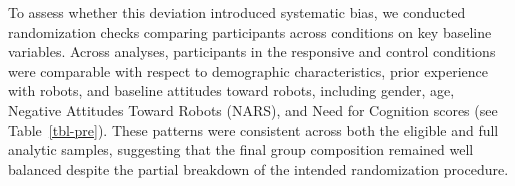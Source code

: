 \documentclass[
]{article}
\begin{document}
To assess whether this deviation introduced systematic bias, we
conducted randomization checks comparing participants across conditions
on key baseline variables. Across analyses, participants in the
responsive and control conditions were comparable with respect to
demographic characteristics, prior experience with robots, and baseline
attitudes toward robots, including gender, age, Negative Attitudes
Toward Robots (NARS), and Need for Cognition scores (see
Table~\ref{tbl-pre})\autocite{cacioppo1982}. These patterns were
consistent across both the eligible and full analytic samples,
suggesting that the final group composition remained well balanced
despite the partial breakdown of the intended randomization procedure.

\begin{table}

\caption{\label{tbl-pre}Baseline participant characteristics by
interaction policy (full sample)}

\centering{

}
\end{table}
\end{document}
